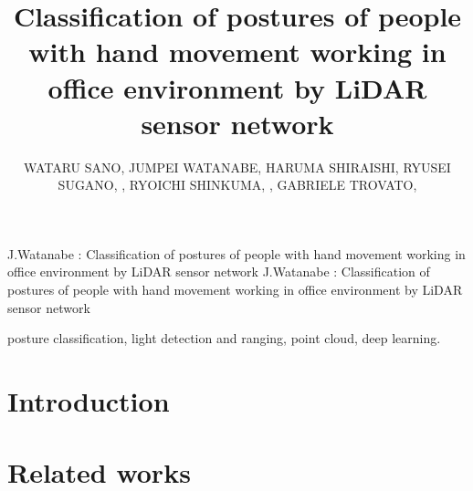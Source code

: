 \documentclass{ieeeaccess}
\begin{document}

\title{Classification of postures of people with hand movement working in office environment by LiDAR sensor network}
\author{
  \uppercase{Wataru Sano},
  \uppercase{Jumpei Watanabe},
  \uppercase{Haruma Shiraishi},
  \uppercase{Ryusei Sugano}, ,
  \uppercase{Ryoichi Shinkuma}, ,
  \uppercase{Gabriele Trovato}, 
}


\address[1]{Shibaura Institute of Technology, Tokyo, Japan}
\address[2]{Hyper Digital Twins Co., Ltd., Tokyo, Japan}


\markboth
{J.Watanabe \headeretal: Classification of postures of people with hand movement working in office environment by LiDAR sensor network}
{J.Watanabe \headeretal: Classification of postures of people with hand movement working in office environment by LiDAR sensor network}



\begin{abstract}
  
\end{abstract}

\begin{keywords}
posture classification, light detection and ranging, point cloud, deep learning. 
\end{keywords}

\titlepgskip=-21pt

\maketitle
{}  %


\section{Introduction}
\label{sec:introduction}


\section{Related works}
\label{sec:related}

\end{document}
